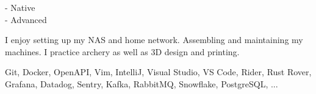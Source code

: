 \documentclass[8pt]{developercv} %
\begin{document}
\vspace{-\baselineskip} %
\begin{minipage}[t]{0.2\textwidth} %
	\vspace{-\baselineskip} %


	 - Native\\
	 - Advanced\\
\end{minipage}
\hfill
\begin{minipage}[t]{0.35\textwidth} %
	\vspace{-\baselineskip} %


	I enjoy setting up my NAS and home network. Assembling and maintaining my machines. I practice archery as well as 3D design and printing.
\end{minipage}
\hfill
\begin{minipage}[t]{0.35\textwidth} %
	\vspace{-\baselineskip} %


	Git, Docker, OpenAPI, Vim, IntelliJ, Visual Studio, VS Code, Rider, Rust Rover, Grafana, Datadog, Sentry, Kafka, RabbitMQ, Snowflake, PostgreSQL, ...
\end{minipage}

\end{document}
